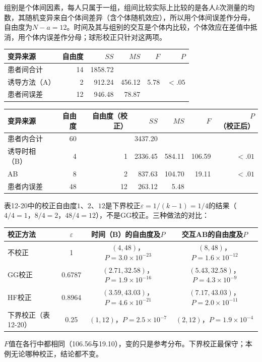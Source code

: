 组别是个体间因素，每人只属于一组，组间比较实际上比较的是各人$k$次测量的均数，其随机变异来自个体间差异（含个体随机效应），所以用个体间误差作分母，自由度为$N-a=12$。时间及其与组别的交互是个体内比较，个体效应在差值中抵消，用个体内误差作分母；球形校正只针对这两项。
\par\noindent\begin{minipage}{\linewidth}
\begin{center}\small\begin{tabular}{lrrrrr}
\toprule 变异来源&自由度&$SS$&$MS$&$F$&$P$\\\midrule
患者间合计&14&1858.72&&&\\
诱导方法（A）&2&912.24&456.12&5.78&$<.05$\\
患者间误差&12&946.48&78.87&&\\\bottomrule
\end{tabular}\end{center}
\end{minipage}\par\medskip

\par\noindent\begin{minipage}{\linewidth}
\begin{center}\small\setlength{\tabcolsep}{5pt}\begin{tabular}{lrrrrrr}
\toprule 变异来源&自由度&自由度（校正）&$SS$&$MS$&$F$&$P$（校正后）\\\midrule
患者内合计&60&&3437.20&&&\\
诱导时相（B）&4&1&2336.45&584.11&106.59&$<.01$\\
AB&8&2&837.63&104.70&19.11&$<.01$\\
患者内误差&48&12&263.12&5.48&&\\\bottomrule
\end{tabular}\end{center}
\end{minipage}\par\medskip
表12-20中的校正自由度$1$、$2$、$12$是下界校正$\varepsilon=1/(k-1)=1/4$的结果（$4/4=1$，$8/4=2$，$48/4=12$），不是GG校正。三种做法的对比：
\begin{center}\small\begin{tabular}{lccc}
\toprule 校正方法&$\varepsilon$&时间（B）的自由度及$P$&交互AB的自由度及$P$\\\midrule
不校正&1&$(4,48)$，$P=3.0\times10^{-23}$&$(8,48)$，$P=1.6\times10^{-12}$\\
GG校正&0.6787&$(2.71,32.58)$，$P=1.9\times10^{-16}$&$(5.43,32.58)$，$P=4.3\times10^{-9}$\\
HF校正&0.8964&$(3.59,43.03)$，$P=4.6\times10^{-21}$&$(7.17,43.03)$，$P=2.0\times10^{-11}$\\
下界校正（表12-20）&0.25&$(1,12)$，$P=2.5\times10^{-7}$&$(2,12)$，$P=1.9\times10^{-4}$\\\bottomrule
\end{tabular}\end{center}
$F$值在各行中都相同（106.56与19.10），变的只是参考分布。下界校正最保守；本例无论哪种校正，结论都不变。

